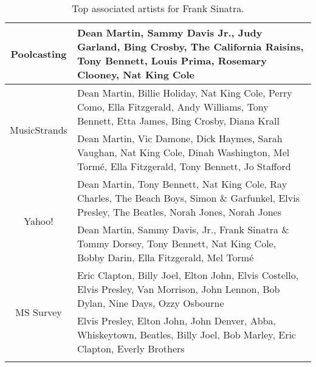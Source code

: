 \begin{table}[bhtp]\centering
\setlength{\extrarowheight}{3pt}
\setlength{\abovecaptionskip}{3pt}
\setlength{\belowcaptionskip}{3pt}
\setlength{\intextsep}{0pt}
\caption{Top associated artists for Frank Sinatra.}\label{table:samplerelevance5}
{\fontsize{8}{10}\selectfont
\begin{tabular}{|c|p{}|}
 \hline 
 \multirow{2}{*}{Poolcasting} &
 Dean Martin, Sammy Davis Jr., Judy Garland, Bing Crosby, The California Raisins, Tony Bennett, Louis Prima, Rosemary Clooney, Nat King Cole \vspace{2pt} \\
 \hline
 \multirow{2}{*}{MusicStrands} &
 Dean Martin, Billie Holiday, Nat King Cole, Perry Como, Ella Fitzgerald, Andy Williams, Tony Bennett, Etta James, Bing Crosby, Diana Krall \vspace{2pt} \\
 \hline
 \multirow{2}{*}{AllMusic} &
 Dean Martin, Vic Damone, Dick Haymes, Sarah Vaughan, Nat King Cole, Dinah Washington, Mel Torm\'{e}, Ella Fitzgerald, Tony Bennett, Jo Stafford \vspace{2pt} \\
 \hline
 \multirow{2}{*}{Yahoo!} &
 Dean Martin, Tony Bennett, Nat King Cole, Ray Charles, The Beach Boys, Simon \& Garfunkel, Elvis Presley, The Beatles, Norah Jones, Norah Jones  \vspace{2pt} \\
 \hline
 \multirow{2}{*}{Last.fm} &
 Dean Martin, Sammy Davis, Jr., Frank Sinatra \& Tommy Dorsey, Tony Bennett, Nat King Cole, Bobby Darin, Ella Fitzgerald, Mel Torm\'{e} \vspace{2pt} \\
 \hline
 \multirow{2}{*}{MS Survey} &
 Eric Clapton, Billy Joel, Elton John, Elvis Costello, Elvis Presley, Van Morrison, John Lennon, Bob Dylan, Nine Days, Ozzy Osbourne \vspace{2pt} \\
 \hline
 \multirow{2}{*}{MS Playlists} &
 Elvis Presley, Elton John, John Denver, Abba, Whiskeytown, Beatles, Billy Joel, Bob Marley, Eric Clapton, Everly Brothers \vspace{2pt} \\
 \hline
 \noalign{\bigskip}
\end{tabular}}
\end{table}

